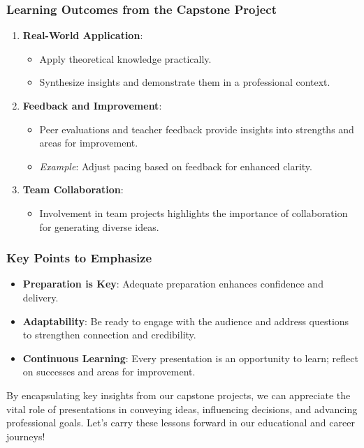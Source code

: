 \documentclass{beamer}
\begin{document}
\begin{frame}[fragile]
    \frametitle{Learning Outcomes from the Capstone Project}
    \begin{enumerate}
        \item \textbf{Real-World Application}:
        \begin{itemize}
            \item Apply theoretical knowledge practically.
            \item Synthesize insights and demonstrate them in a professional context.
        \end{itemize}

        \item \textbf{Feedback and Improvement}:
        \begin{itemize}
            \item Peer evaluations and teacher feedback provide insights into strengths and areas for improvement.
            \item \textit{Example}: Adjust pacing based on feedback for enhanced clarity.
        \end{itemize}

        \item \textbf{Team Collaboration}:
        \begin{itemize}
            \item Involvement in team projects highlights the importance of collaboration for generating diverse ideas.
        \end{itemize}
    \end{enumerate}
\end{frame}

\begin{frame}[fragile]
    \frametitle{Key Points to Emphasize}
    \begin{itemize}
        \item \textbf{Preparation is Key}: Adequate preparation enhances confidence and delivery.
        \item \textbf{Adaptability}: Be ready to engage with the audience and address questions to strengthen connection and credibility.
        \item \textbf{Continuous Learning}: Every presentation is an opportunity to learn; reflect on successes and areas for improvement.
    \end{itemize}

    By encapsulating key insights from our capstone projects, we can appreciate the vital role of presentations in conveying ideas, influencing decisions, and advancing professional goals. Let's carry these lessons forward in our educational and career journeys!
\end{frame}
\end{document}
